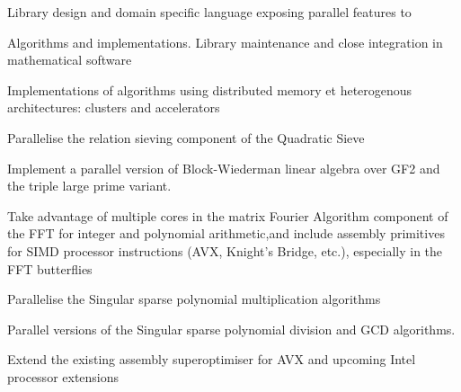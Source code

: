 \begin{workpackage}[id=hpc,wphases=36-48,
  title=High Performance Computing,
  PSRM=1, %
  LLRM=12, %
  SARM=1, %
  UKRM=1, %
  UBRM=1, %
  UJFRM=12]
\begin{wpdelivs}
  \begin{wpdeliv}[due=12,id=LinBox-DSL,dissem=PU,nature=R]
    {Library design and domain specific language exposing \Linbox parallel features to \Sage}
  \end{wpdeliv}
  \begin{wpdeliv}[due=24,id=LinBox-algo,dissem=PU,nature=DEM]
    {Algorithms and implementations. Library maintenance and close integration
      in mathematical software}
  \end{wpdeliv}
  \begin{wpdeliv}[due=36,id=LinBox-distributed,dissem=PU,nature=DEM]
    {Implementations of algorithms using distributed memory et heterogenous
      architectures: clusters and accelerators}
  \end{wpdeliv}
  \begin{wpdeliv}[due=3,id=QS-sieving,dissem=PU,nature=DEM]
      {Parallelise the relation sieving component of the Quadratic Sieve}
\end{wpdeliv}
  \begin{wpdeliv}[due=9,id=QS-linalg,dissem=PU,nature=DEM]
      {Implement a parallel version of Block-Wiederman linear algebra over GF2 and the triple large prime variant.}
\end{wpdeliv}
  \begin{wpdeliv}[due=12,id=FFT,dissem=PU,nature=DEM]
    {Take advantage of multiple cores in the matrix Fourier Algorithm component of the FFT
      for integer and polynomial arithmetic,and include assembly primitives for SIMD
      processor instructions (AVX, Knight's Bridge, etc.), especially in the FFT
      butterflies}
\end{wpdeliv}
  \begin{wpdeliv}[due=12,id=singular-polymul,dissem=PU,nature=DEM]
      {Parallelise the Singular sparse polynomial multiplication algorithms}
\end{wpdeliv}
  \begin{wpdeliv}[due=12,id=singular-polyarith,dissem=PU,nature=DEM]
      {Parallel versions of the Singular sparse polynomial division and GCD algorithms.}
\end{wpdeliv}
  \begin{wpdeliv}[due=12,id=MPIRsuperoptimiser,dissem=PU,nature=DEM]
      {Extend the existing assembly superoptimiser for AVX and upcoming Intel processor extensions}
\end{wpdeliv}
  \begin{wpdeliv}[due=24,id=MPIRprocessors,dissem=PU,nature=DEM]

\end{wpdeliv}
\end{wpdelivs}
\end{workpackage}
